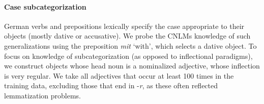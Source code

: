 %
%

\paragraph{Case subcategorization}
German verbs and prepositions lexically specify the case appropriate
to their objects (mostly dative or accusative).  We probe the CNLMs
knowledge of such generalizations using the preposition \textit{mit}
`with', which selects a dative object. To focus on knowledge of
subcategorization (as opposed to inflectional paradigms), we construct
objects whose head noun is a nominalized adjective, whose inflection
is very regular.  We take all adjectives that occur at least 100 times
in the training data, excluding those that end in -\emph{r}, as these
often reflected lemmatization problems.

